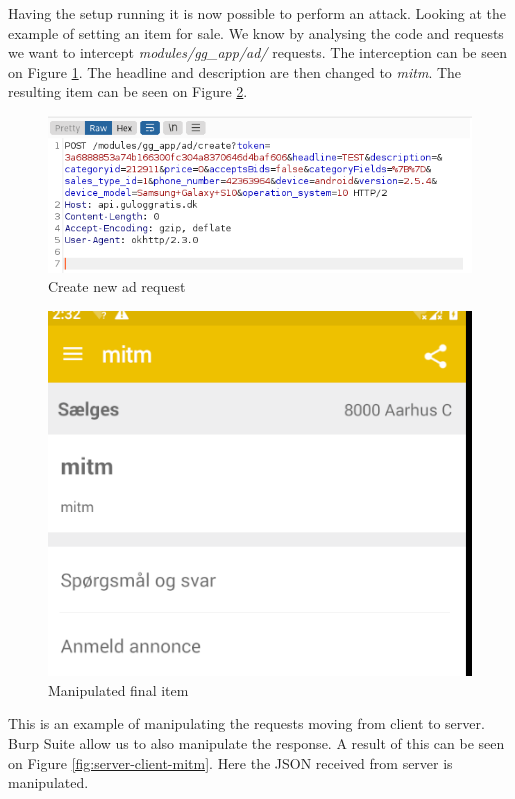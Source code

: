Having the setup running it is now possible to perform an attack. Looking at the example of setting an item for sale. We know by analysing the code and requests we want to intercept \textit{modules/gg\_app/ad/} requests. The interception can be seen on Figure \ref{fig:attack-new-ad}. The headline and description are then changed to \textit{mitm}. The resulting item can be seen on Figure \ref{fig:attack-final-ad}.  

\begin{figure}[htbp]
    \centering
    \includegraphics[width=1\columnwidth]{../dynamic-analysis/pictures/MITM-auction-burp.png}
    \caption{Create new ad request}
    \label{fig:attack-new-ad}
\end{figure}

\begin{figure}[htbp]
    \centering
    \includegraphics[width=0.5\columnwidth]{../dynamic-analysis/pictures/mitm_auction.png}
    \caption{Manipulated final item}
    \label{fig:attack-final-ad}
\end{figure}

This is an example of manipulating the requests moving from client to server. Burp Suite allow us to also manipulate the response. A result of this can be seen on Figure \ref{fig:server-client-mitm}. Here the JSON received from server is manipulated.  

